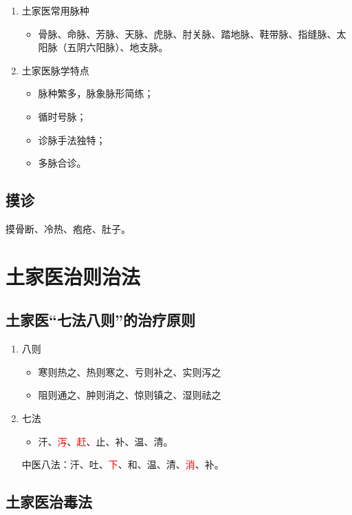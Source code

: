 \documentclass[cn,hazy,blue,12pt,normal,founder]{elegantnote}
\newcommand{\redt}[1]{\textcolor{red}{{}#1}}      %
\begin{document}
\begin{enumerate}
  \item 土家医常用脉种
  \begin{itemize}
    \item 骨脉、命脉、芳脉、天脉、虎脉、肘关脉、踏地脉、鞋带脉、指缝脉、太阳脉（五阴六阳脉）、地支脉。
  \end{itemize}
  \item 土家医脉学特点
  \begin{itemize}
    \item 脉种繁多，脉象脉形简练；
    \item 循时号脉；
    \item 诊脉手法独特；
    \item 多脉合诊。
  \end{itemize}
\end{enumerate}

\subsection{摸诊}

摸骨断、冷热、疱疮、肚子。

\section{土家医治则治法}

\subsection{土家医“七法八则”的治疗原则}

\begin{enumerate}
  \item 八则
  \begin{itemize}
    \item 寒则热之、热则寒之、亏则补之、实则泻之
    \item 阻则通之、肿则消之、惊则镇之、湿则祛之
  \end{itemize}
  \item 七法
  \begin{itemize}
    \item 汗、\redt{泻}、\redt{赶}、止、补、温、清。
  \end{itemize}
  \begin{note}
  中医八法：汗、吐、\redt{下}、和、温、清、\redt{消}、补。
  \end{note}
\end{enumerate}

\subsection{土家医治毒法}
\end{document}
